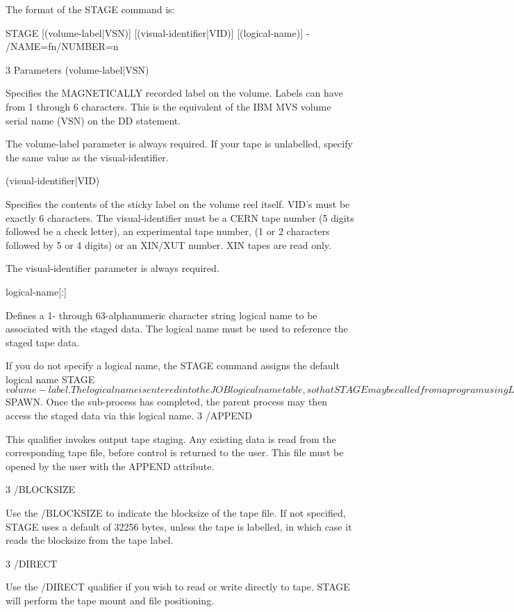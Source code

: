\begin{XMP}
The format of the STAGE command is:

STAGE [(volume-label|VSN)] [(visual-identifier|VID)] [(logical-name)] -
  /NAME=fn/NUMBER=n

3 Parameters
 (volume-label|VSN)

Specifies the MAGNETICALLY recorded label on the volume.
Labels can have from 1 through 6 characters. This is the
equivalent of the IBM MVS volume serial name (VSN) on the DD statement.

The volume-label parameter is  always required. If your tape is unlabelled,
specify the same value as the visual-identifier.

 (visual-identifier|VID)

Specifies the contents of the sticky label on the volume reel itself.
VID's must be exactly 6 characters.
The visual-identifier must be a CERN tape number (5 digits followed
be a check letter), an experimental tape number, (1 or 2 characters
followed by 5 or 4 digits) or an XIN/XUT number.
XIN tapes are read only.

The visual-identifier parameter is  always required.

 logical-name[:]

Defines a 1- through  63-alphanumeric  character  string  logical
name to be associated with the staged data.
The logical name must be used to reference the staged tape data.

If you do not specify a logical name, the STAGE  command  assigns
the  default  logical  name  STAGE$volume-label.

The logical name is entered into the JOB logical name table, so that
STAGE may be called from a program using LIB$SPAWN. Once the sub-process
has completed, the parent process may then access the staged data via
this logical name.
3 /APPEND

This qualifier invokes output tape staging. Any existing data
is read from the corresponding tape file, before control is
returned to the user. This file must be opened by the user
with the APPEND attribute.

3 /BLOCKSIZE

Use the /BLOCKSIZE to indicate the blocksize of the tape file.
If not specified, STAGE uses a default of 32256 bytes, unless the tape is
labelled, in which case it reads the blocksize from the tape label.

3 /DIRECT

Use the /DIRECT qualifier if you wish to read or write directly to tape.
STAGE will perform the tape mount and file positioning.


\end{XMP}
